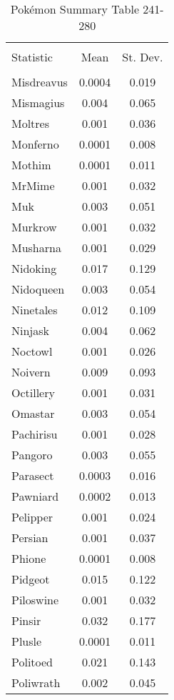 \documentclass[12pt,twoside]{reedthesis}
\begin{document}
  \begin{table}[!htbp] \centering 
    \caption{Pokémon Summary Table 241-280} 
    \label{} 
  \begin{tabular}{@{\extracolsep{5pt}}lcc} 
  \\[-1.8ex]\hline 
  \hline \\[-1.8ex] 
  Statistic & \multicolumn{1}{c}{Mean} & \multicolumn{1}{c}{St. Dev.} \\ 
  \hline \\[-1.8ex] 
  Misdreavus & 0.0004 & 0.019 \\ 
  Mismagius & 0.004 & 0.065 \\ 
  Moltres & 0.001 & 0.036 \\ 
  Monferno & 0.0001 & 0.008 \\ 
  Mothim & 0.0001 & 0.011 \\ 
  MrMime & 0.001 & 0.032 \\ 
  Muk & 0.003 & 0.051 \\ 
  Murkrow & 0.001 & 0.032 \\ 
  Musharna & 0.001 & 0.029 \\ 
  Nidoking & 0.017 & 0.129 \\ 
  Nidoqueen & 0.003 & 0.054 \\ 
  Ninetales & 0.012 & 0.109 \\ 
  Ninjask & 0.004 & 0.062 \\ 
  Noctowl & 0.001 & 0.026 \\ 
  Noivern & 0.009 & 0.093 \\ 
  Octillery & 0.001 & 0.031 \\ 
  Omastar & 0.003 & 0.054 \\ 
  Pachirisu & 0.001 & 0.028 \\ 
  Pangoro & 0.003 & 0.055 \\ 
  Parasect & 0.0003 & 0.016 \\ 
  Pawniard & 0.0002 & 0.013 \\ 
  Pelipper & 0.001 & 0.024 \\ 
  Persian & 0.001 & 0.037 \\ 
  Phione & 0.0001 & 0.008 \\ 
  Pidgeot & 0.015 & 0.122 \\ 
  Piloswine & 0.001 & 0.032 \\ 
  Pinsir & 0.032 & 0.177 \\ 
  Plusle & 0.0001 & 0.011 \\ 
  Politoed & 0.021 & 0.143 \\ 
  Poliwrath & 0.002 & 0.045 \\ 

\end{tabular}
\end{table}
\end{document}
